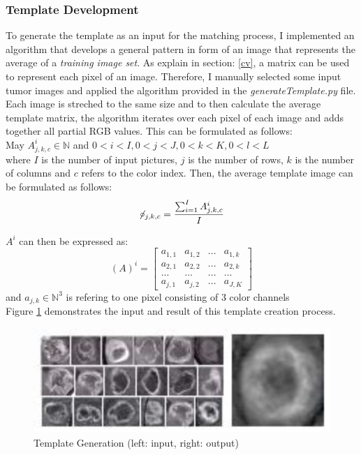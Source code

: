 \documentclass[twoside,11pt]{article}
\begin{document}
\subsubsection{Template Development}
\label{template-dev}
To generate the template as an input for the matching process, I implemented an algorithm that develops a general pattern in form of an image that represents the average of a \textit{training image set}. As explain in section: \ref{cv}, a matrix can be used to represent each pixel of an image. Therefore, I manually selected some input tumor images and applied the algorithm provided in the \textit{generateTemplate.py} file. Each image is streched to the same size and to then calculate the average template matrix, the algorithm iterates over each pixel of each image and adds together all partial RGB values. This can be formulated as follows: 
\\

May $A_{j,k,c}^{i} \in \mathbb{N}$  and $0 < i < I , 0 < j < J , 0 < k < K , 0 < l < L $  
\\

where $I$ is the number of input pictures, 
$j$ is the number of  rows, 
$k$ is the number of columns and
$c$ refers to the color index.
Then, the average template image can be formulated as follows:
$$
\not\!\circ_{j,k,c} = \frac{\sum_{i=1}^{I} A_{j,k,c}^{i}}{I}
$$

$A^{i}$ can then be expressed as:
\[
(A)^{i}=
\begin{bmatrix}
a_{1,1} & a_{1,2} &  ... & a_{1,k}\\ 
a_{2,1} & a_{2,2} &  ... & a_{2,k}\\ 
... & ... & ... & ... \\ 
a_{j,1} & a_{j,2} & ... & a_{J,K}
\end{bmatrix}
\]
and  $a_{j,k} \in \mathbb{N}^{3}$ is refering to one pixel consisting of 3 color channels
\\


Figure \ref{fig:template-generation} demonstrates the input and result of this template creation process.

\begin{figure}
	\label{fig:template-generation}
	\centering
	\includegraphics[height=4cm]{template-generation}
	\caption{Template Generation (left: input, right: output)}
\end{figure}%
\end{document}
